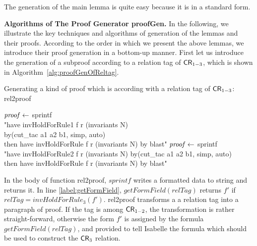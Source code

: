 The generation of the main lemma is quite easy because it is in a standard form.

\medskip\noindent
{\bf Algorithms of The Proof Generator {\sf proofGen}.}
In the following, we illustrate the key techniques and algorithms of generation of
the lemmas and their proofs.
According to the order in which we present the above lemmas,
we introduce their proof generation in a bottom-up manner.
First let us introduce the generation of a subproof according to a relation tag of
${\sf CR}_{1-3}$, which is shown in Algorithm~\ref{alg:proofGenOfReltag}.

\begin{algorithm}[!t]
\caption{Generating a kind of proof which is according with a relation tag of ${\sf CR}_{1-3}$: rel2proof}
\label{alg:proofGenOfReltag}
{
  {${\it proof} \leftarrow $ sprintf\\
\twoSpaces"have invHoldForRule1 f r (invariants N)  \\
\twoSpaces         by(cut\_tac a1 a2 b1, simp, auto) \\
\twoSpaces then have invHoldForRule f r (invariants N)  by blast" \; }
  {${\it proof} \leftarrow$  sprintf\\
\twoSpaces"have invHoldForRule2 f r (invariants N)
\twoSpaces         by(cut\_tac a1 a2 b1, simp, auto) \\
\twoSpaces then have invHoldForRule f r (invariants N)  by blast" \; }
}
\end{algorithm}

In the body of function {\sf rel2proof},
$sprintf$ writes a formatted data to string and returns it.
In line \ref{label:getFormField}, $getFormField(relTag)$ returns $f'$ if $relTag=invHoldForRule_3(f')$.
{\sf rel2proof} transforms a a relation tag into a paragraph of proof.
If the tag is among ${\sf CR}_{1-2}$,
the transformation is rather straight-forward,
otherwise the form $f'$ is assigned by the formula $getFormField(relTag)$,
and provided to tell Isabelle the formula which should be used to construct the ${\sf CR}_3$ relation.

